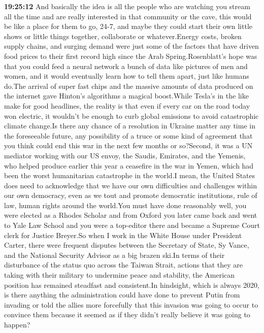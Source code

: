 \documentclass{article}%
\begin{document}
\textbf{19:25:12}%
\newline%
And basically the idea is all the people who are watching you stream all the time and are really interested in that community or the cave, this would be like a place for them to go, 24{-}7, and maybe they could start their own little shows or little things together, collaborate or whatever.Energy costs, broken supply chains, and surging demand were just some of the factors that have driven food prices to their first record high since the Arab Spring.Rosenblatt's hope was that you could feed a neural network a bunch of data like pictures of men and women, and it would eventually learn how to tell them apart, just like humans do.The arrival of super fast chips and the massive amounts of data produced on the internet gave Hinton's algorithms a magical boost.While Tesla's in the like make for good headlines, the reality is that even if every car on the road today won electric, it wouldn't be enough to curb global emissions to avoid catastrophic climate change.Is there any chance of a resolution in Ukraine matter any time in the foreseeable future, any possibility of a truce or some kind of agreement that you think could end this war in the next few months or so?Second, it was a UN mediator working with our US envoy, the Saudis, Emirates, and the Yemenis, who helped produce earlier this year a ceasefire in the war in Yemen, which had been the worst humanitarian catastrophe in the world.I mean, the United States does need to acknowledge that we have our own difficulties and challenges within our own democracy, even as we tout and promote democratic institutions, rule of law, human rights around the world.You must have done reasonably well, you were elected as a Rhodes Scholar and from Oxford you later came back and went to Yale Law School and you were a top{-}editor there and became a Supreme Court clerk for Justice Breyer.So when I work in the White House under President Carter, there were frequent disputes between the Secretary of State, Sy Vance, and the National Security Advisor as a big brazen ski.In terms of their disturbance of the status quo across the Taiwan Strait, actions that they are taking with their military to undermine peace and stability, the American position has remained steadfast and consistent.In hindsight, which is always 2020, is there anything the administration could have done to prevent Putin from invading or told the allies more forcefully that this invasion was going to occur to convince them because it seemed as if they didn't really believe it was going to happen?%
\end{document}
